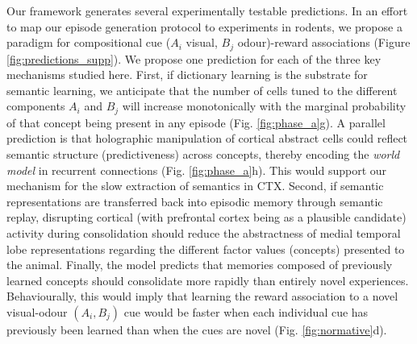 \documentclass{article}
\begin{document}
\newline\newline
Our framework generates several experimentally testable predictions. In an effort to map our episode generation protocol to experiments in rodents, we propose a paradigm for compositional cue ($A_i$ visual, $B_j$ odour)-reward associations (Figure \ref{fig:predictions_supp}). We propose one prediction for each of the three key mechanisms studied here. First, if dictionary learning is the substrate for semantic learning, we anticipate that the number of cells tuned to the different components $A_i$ and $B_j$ will increase monotonically with the marginal probability of that concept being present in any episode (Fig. \ref{fig:phase_a}g). A parallel prediction is that holographic manipulation of cortical abstract cells could reflect semantic structure (predictiveness) across concepts, thereby encoding the \textit{world model} in recurrent connections (Fig. \ref{fig:phase_a}h). This would support our mechanism for the slow extraction of semantics in CTX. Second, if semantic representations are transferred back into episodic memory through semantic replay, disrupting cortical (with prefrontal cortex being as a plausible candidate) activity during consolidation should reduce the abstractness  of medial temporal lobe representations regarding the different factor values (concepts) presented to the animal. Finally, the model predicts that memories composed of previously learned concepts should consolidate more rapidly than entirely novel experiences. Behaviourally, this would imply that learning the reward association to a novel visual-odour $(A_i, B_j)$ cue would be faster when each individual cue has previously been learned than when the cues are novel (Fig. \ref{fig:normative}d).
\newline\newline
\end{document}
